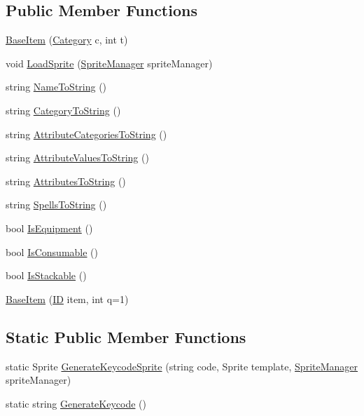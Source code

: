 \subsection*{Public Member Functions}
\begin{DoxyCompactItemize}
\item 
\mbox{\hyperlink{class_base_item_a77ce3304ad35c5fdb9ed807beac19a66}{Base\+Item}} (\mbox{\hyperlink{class_base_item_a882a2962396f880c2e23755437245d37}{Category}} c, int t)
\item 
void \mbox{\hyperlink{class_base_item_abedb8e41aaa0f3ee702ae8fa678204e2}{Load\+Sprite}} (\mbox{\hyperlink{class_sprite_manager}{Sprite\+Manager}} sprite\+Manager)
\item 
string \mbox{\hyperlink{class_base_item_a837fa537092e144e95b353e3f1ffaeb6}{Name\+To\+String}} ()
\item 
string \mbox{\hyperlink{class_base_item_ad820521a001d82fc3f52b2483226efde}{Category\+To\+String}} ()
\item 
string \mbox{\hyperlink{class_base_item_ac92f27fa7357e9cb20c62704ecca021a}{Attribute\+Categories\+To\+String}} ()
\item 
string \mbox{\hyperlink{class_base_item_a414dcba1b98b9d67f2254b885049bfca}{Attribute\+Values\+To\+String}} ()
\item 
string \mbox{\hyperlink{class_base_item_afd59d6b5168af724211f54ad3692ea73}{Attributes\+To\+String}} ()
\item 
string \mbox{\hyperlink{class_base_item_a7b49af5c45c493b9ea7319de44c6c138}{Spells\+To\+String}} ()
\item 
bool \mbox{\hyperlink{class_base_item_a251c4cb0509ed9191a07057f8ea388c6}{Is\+Equipment}} ()
\item 
bool \mbox{\hyperlink{class_base_item_a3888fc05b9a0589c098ed9a8c2f978f2}{Is\+Consumable}} ()
\item 
bool \mbox{\hyperlink{class_base_item_ad59a505bcfb8a026519ca912d0c1d8d3}{Is\+Stackable}} ()
\item 
\mbox{\hyperlink{class_base_item_a4faa2410aa193b87718cc3ed337c0766}{Base\+Item}} (\mbox{\hyperlink{class_base_item_add9920d2f5a4fa91752714a8f3ab424b}{ID}} item, int q=1)
\end{DoxyCompactItemize}
\subsection*{Static Public Member Functions}
\begin{DoxyCompactItemize}
\item 
static Sprite \mbox{\hyperlink{class_base_item_a0bb5888f3371b291645137272f417b30}{Generate\+Keycode\+Sprite}} (string code, Sprite template, \mbox{\hyperlink{class_sprite_manager}{Sprite\+Manager}} sprite\+Manager)
\item 
static string \mbox{\hyperlink{class_base_item_aa3a6bc4a2af6c424898277764e9c0585}{Generate\+Keycode}} ()
\end{DoxyCompactItemize}
